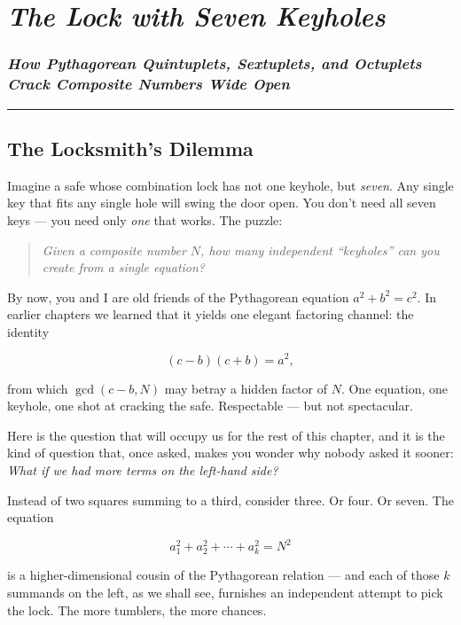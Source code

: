 \chapter{\texorpdfstring{\emph{The Lock with Seven Keyholes}}{The Lock with Seven Keyholes}}
\subsection{\texorpdfstring{\emph{How Pythagorean Quintuplets, Sextuplets, and Octuplets Crack Composite Numbers Wide Open}}{How Pythagorean Quintuplets, Sextuplets, and Octuplets Crack Composite Numbers Wide Open}}
\bigskip\noindent\rule{\linewidth}{0.4pt}\bigskip

\section{The Locksmith's Dilemma}
Imagine a safe whose combination lock has not one keyhole, but \emph{seven}. Any single key that fits any single hole will swing the door open. You don't need all seven keys --- you need only \emph{one} that works. The puzzle:

\begin{quote}
\emph{Given a composite number \(N\), how many independent ``keyholes'' can you create from a single equation?}
\end{quote}

By now, you and I are old friends of the Pythagorean equation \(a^2 + b^2 = c^2\). In earlier chapters we learned that it yields one elegant factoring channel: the identity

\[(c - b)(c + b) = a^2,\]

from which \(\gcd(c - b, N)\) may betray a hidden factor of \(N\). One equation, one keyhole, one shot at cracking the safe. Respectable --- but not spectacular.

Here is the question that will occupy us for the rest of this chapter, and it is the kind of question that, once asked, makes you wonder why nobody asked it sooner: \emph{What if we had more terms on the left-hand side?}

Instead of two squares summing to a third, consider three. Or four. Or seven. The equation

\[a_1^2 + a_2^2 + \cdots + a_k^2 = N^2\]

is a higher-dimensional cousin of the Pythagorean relation --- and each of those \(k\) summands on the left, as we shall see, furnishes an independent attempt to pick the lock. The more tumblers, the more chances.

